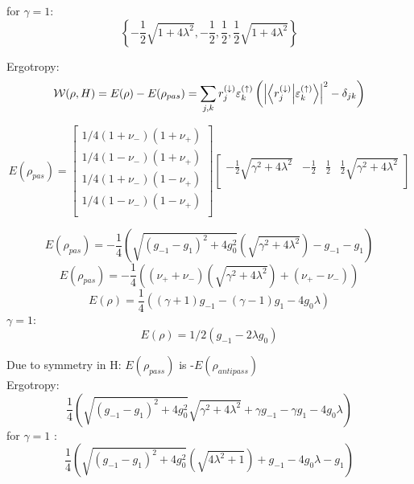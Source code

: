 \documentclass[12pt,a4paper]{book}
\theoremstyle{definition}
\begin{document}
for $\gamma=1$:
\begin{equation}
	\left\{-\frac{1}{2} \sqrt{1+4 \lambda ^2},-\frac{1}{2},\frac{1}{2},\frac{1}{2} \sqrt{1+4 \lambda ^2}\right\}
\end{equation}

Ergotropy:
\begin{equation}
	\mathcal{W}(\rho,H)=E(\rho)-E(\rho_{pas})=\sum_{j, k} r_{j}^{(\downarrow)} \varepsilon_{k}^{(\uparrow)}\left( \left|\braket{r_j^{(\downarrow)}}{\varepsilon_{k}^{(\uparrow)}}\right|^2-\delta_{jk}\right)
\end{equation} 

\begin{equation}
E(\rho_{pas})=
\left[ \begin{array}{c}
	1/4(1+\nu_-)(1+\nu_+)\\ 
	1/4(1-\nu_-)(1+\nu_+)\\
	1/4(1+\nu_-)(1-\nu_+)\\
	1/4(1-\nu_-)(1-\nu_+) \\ 
\end{array} \right]
\left[
\begin{array}{cccc}
	-\frac{1}{2}\sqrt{\gamma ^2+4 \lambda ^2}	& -\frac{1}{2} & \frac{1}{2} & \frac{1}{2} \sqrt{\gamma ^2+4 \lambda ^2} \\
\end{array} \right]
\end{equation}

\begin{equation}
	E(\rho_{pas})=
	-\frac{1}{4} \left(\sqrt{(g_{-1}- g_1)^2 +4 g_0^2} \left(\sqrt{\gamma ^2+4 \lambda ^2}\right)-g_{-1}-g_1\right)
\end{equation}
\begin{equation}
	E(\rho_{pas})=
	-\frac{1}{4} \left(( \nu_+ + \nu_-) \left(\sqrt{\gamma ^2+4 \lambda ^2}\right)+(\nu_+ - \nu_-)\right)
\end{equation}
\begin{equation}
E(\rho)=\frac{1}{4} \left((\gamma +1) g_{-1}-(\gamma -1) g_1-4 g_0 \lambda \right)
\end{equation}
$\gamma=1$:
\begin{equation}
E(\rho)= 1/2(g_{-1}-2\lambda g_0)
\end{equation}

Due to symmetry in H: $E(\rho_{pass})$ is -$E(\rho_{antipass})$ \\
Ergotropy:
\begin{equation}
	\frac{1}{4} \left(\sqrt{(g_{-1}- g_1)^2+4 g_0^2} \sqrt{\gamma ^2+4 \lambda ^2}+\gamma  g_{-1}-\gamma  g_1-4 g_0 \lambda \right)
\end{equation}
for $\gamma=1$ :\\
\begin{equation}
\frac{1}{4} \left(\sqrt{(g_{-1}- g_1)^2 +4 g_0^2} \left(\sqrt{4 \lambda ^2+1}\right)+ g_{-1}-4 g_0 \lambda -g_1\right)
\end{equation}
\end{document}
